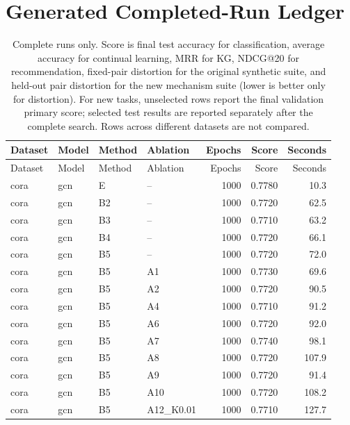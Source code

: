 \section{Generated Completed-Run Ledger}
\label{app:run-ledger}

\scriptsize\setlength{\tabcolsep}{4.2pt}\renewcommand{\arraystretch}{1.12}
\begin{longtable}{llllrrr}
\caption{Complete runs only. Score is final test accuracy for classification, average accuracy for continual learning, MRR for KG, NDCG@20 for recommendation, fixed-pair distortion for the original synthetic suite, and held-out pair distortion for the new mechanism suite (lower is better only for distortion). For new tasks, unselected rows report the final validation primary score; selected test results are reported separately after the complete search. Rows across different datasets are not compared.}\\
\toprule
Dataset & Model & Method & Ablation & Epochs & Score & Seconds \\
\midrule
\endfirsthead
\toprule
Dataset & Model & Method & Ablation & Epochs & Score & Seconds \\
\midrule
\endhead
cora & gcn & E & -- & 1000 & 0.7780 & 10.3 \\
cora & gcn & B2 & -- & 1000 & 0.7720 & 62.5 \\
cora & gcn & B3 & -- & 1000 & 0.7710 & 63.2 \\
cora & gcn & B4 & -- & 1000 & 0.7720 & 66.1 \\
\rowcolor{oursbg}
cora & gcn & B5 & -- & 1000 & 0.7720 & 72.0 \\
\rowcolor{oursbg}
cora & gcn & B5 & A1 & 1000 & 0.7730 & 69.6 \\
\rowcolor{oursbg}
cora & gcn & B5 & A2 & 1000 & 0.7720 & 90.5 \\
\rowcolor{oursbg}
cora & gcn & B5 & A4 & 1000 & 0.7710 & 91.2 \\
\rowcolor{oursbg}
cora & gcn & B5 & A6 & 1000 & 0.7720 & 92.0 \\
\rowcolor{oursbg}
cora & gcn & B5 & A7 & 1000 & 0.7740 & 98.1 \\
\rowcolor{oursbg}
cora & gcn & B5 & A8 & 1000 & 0.7720 & 107.9 \\
\rowcolor{oursbg}
cora & gcn & B5 & A9 & 1000 & 0.7720 & 91.4 \\
\rowcolor{oursbg}
cora & gcn & B5 & A10 & 1000 & 0.7720 & 108.2 \\
\rowcolor{oursbg}
cora & gcn & B5 & A12\_K0.01 & 1000 & 0.7710 & 127.7 \\

\end{longtable}
